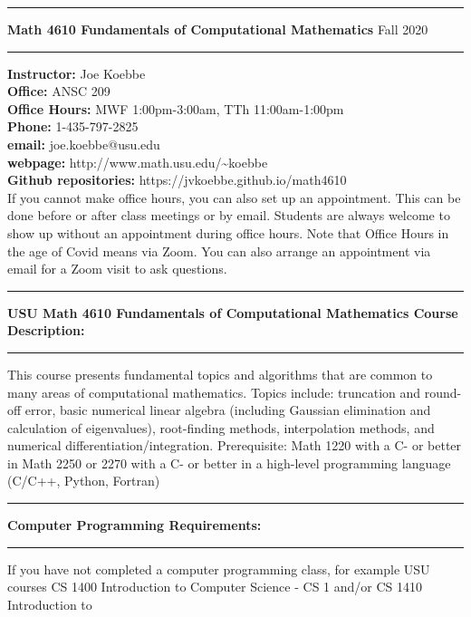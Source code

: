\documentclass[10pt,fleqn]{article}
\begin{document}
%
\pagestyle{empty}
\vskip0.1in\hrule\vskip0.1in \noindent
{\bf
   Math 4610 Fundamentals of Computational Mathematics
} \hfill Fall 2020
\vskip0.1in\hrule\vskip0.1in
\noindent
{\bf Instructor:} \hfill   Joe Koebbe \\
\smallskip\noindent
{\bf Office:}     \hfill   ANSC 209 \\
\smallskip\noindent
{\bf Office Hours:} \hfill MWF 1:00pm-3:00am, TTh 11:00am-1:00pm \\
\smallskip\noindent
{\bf Phone:}      \hfill   1-435-797-2825 \\
\smallskip\noindent
{\bf email:}      \hfill   joe.koebbe@usu.edu \\
\smallskip\noindent
{\bf webpage:}    \hfill   http://www.math.usu.edu/\~{}koebbe \\
\smallskip\noindent
{\bf Github repositories:}    \hfill   https://jvkoebbe.github.io/math4610 \\
\smallskip\noindent
If you cannot make office hours, you can also set up an appointment. This can be
done before or after class meetings or by email. Students are always welcome to
show up without an appointment during office hours. Note that Office Hours in
the age of Covid means via Zoom. You can also arrange an appointment via email
for a Zoom visit to ask questions.
\vskip0.1in\hrule\vskip0.1in
\noindent
{\bf USU Math 4610 Fundamentals of Computational Mathematics Course
     Description:}
\vskip0.1in\hrule\vskip0.1in
\noindent
This course presents fundamental topics and algorithms that are common to many
areas of computational mathematics. Topics include: truncation and round-off
error, basic numerical linear algebra (including Gaussian elimination and
calculation of eigenvalues), root-finding methods, interpolation methods, and
numerical differentiation/integration. Prerequisite: Math 1220 with a C- or
better in Math 2250 or 2270 with a C- or better in a high-level programming
language (C/C++, Python, Fortran) 
\vskip0.1in\hrule\vskip0.1in
\noindent
{\bf Computer Programming Requirements:}
\vskip0.1in\hrule\vskip0.1in
\noindent
If you have not completed a computer programming class, for example USU courses
CS 1400 Introduction to Computer Science - CS 1 and/or CS 1410 Introduction to
\end{document}
